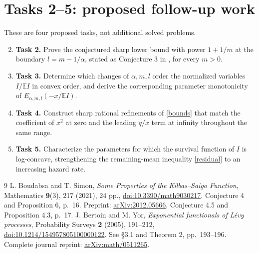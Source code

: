 \documentclass[11pt]{article}
\newcommand{\EE}{\mathbb E}
\begin{document}
\section*{Tasks 2--5: proposed follow-up work}
These are four proposed tasks, not additional solved problems.
\begin{enumerate}
 \setcounter{enumi}{1}
 \item \textbf{Task 2.} Prove the conjectured sharp lower bound with
 power $1+1/m$ at the boundary $l=m-1/\alpha$, stated as
 Conjecture 3 in \cite{BS}, for every $m>0$.
 \item \textbf{Task 3.} Determine which changes of $\alpha,m,l$
 order the normalized variables $I/\EE I$ in convex order, and
 derive the corresponding parameter monotonicity of
 $E_{\alpha,m,l}(-x/\EE I)$.
 \item \textbf{Task 4.} Construct sharp rational refinements of
 \eqref{bounds} that match the coefficient of $x^2$ at zero and
 the leading $q/x$ term at infinity throughout the same range.
 \item \textbf{Task 5.} Characterize the parameters for which the
 survival function of $I$ is log-concave, strengthening the
 remaining-mean inequality \eqref{residual} to an increasing
 hazard rate.
\end{enumerate}

\begin{thebibliography}{9}
 L. Boudabsa and T. Simon,
\emph{Some Properties of the Kilbas--Saigo Function},
Mathematics \textbf{9}(3), 217 (2021), 24 pp.,
\href{https://doi.org/10.3390/math9030217}{doi:10.3390/math9030217}.
Conjecture 4 and Proposition 6, p.~16.
Preprint: \href{https://arxiv.org/abs/2012.05666}{arXiv:2012.05666},
Conjecture 4.5 and Proposition 4.3, p.~17.
 J. Bertoin and M. Yor,
\emph{Exponential functionals of L\'evy processes},
Probability Surveys \textbf{2} (2005), 191--212,
\href{https://doi.org/10.1214/154957805100000122}{doi:10.1214/154957805100000122}.
See \S3.1 and Theorem 2, pp.~193--196.
Complete journal reprint:
\href{https://arxiv.org/abs/math/0511265}{arXiv:math/0511265}.
\end{thebibliography}
\end{document}
